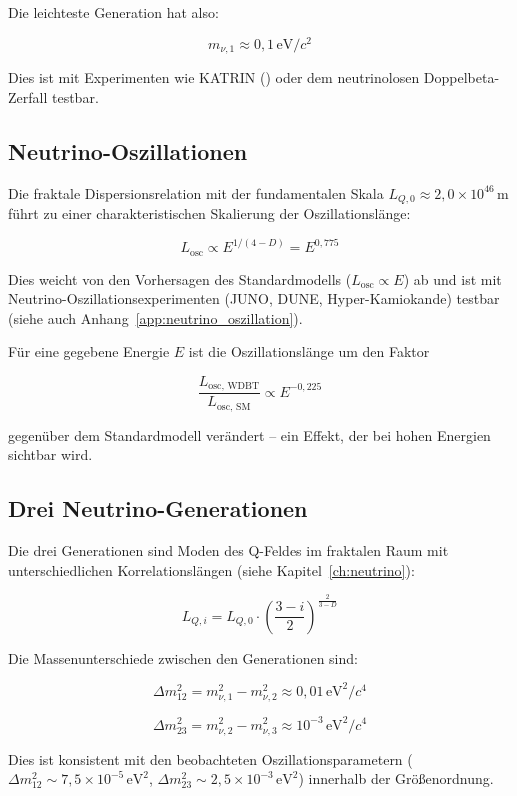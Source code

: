 Die leichteste Generation hat also:

\[
\boxed{m_{\nu,1} \approx 0,1 \, \text{eV}/c^2}
\]

Dies ist mit Experimenten wie KATRIN (\cite{KATRIN2022}) oder dem neutrinolosen Doppelbeta-Zerfall testbar.

\subsection{Neutrino-Oszillationen}
\label{sub:vorh_neutrino_osz}

Die fraktale Dispersionsrelation mit der fundamentalen Skala \( L_{Q,0} \approx 2{,}0 \times 10^{46} \, \text{m} \) führt zu einer charakteristischen Skalierung der Oszillationslänge:

\[
L_{\text{osc}} \propto E^{1/(4-D)} = E^{0,775}
\]

Dies weicht von den Vorhersagen des Standardmodells (\( L_{\text{osc}} \propto E \)) ab und ist mit Neutrino-Oszillationsexperimenten (JUNO, DUNE, Hyper-Kamiokande) testbar (siehe auch Anhang~\ref{app:neutrino_oszillation}).

Für eine gegebene Energie \( E \) ist die Oszillationslänge um den Faktor

\[
\frac{L_{\text{osc, WDBT}}}{L_{\text{osc, SM}}} \propto E^{-0,225}
\]

gegenüber dem Standardmodell verändert – ein Effekt, der bei hohen Energien sichtbar wird.

\subsection{Drei Neutrino-Generationen}
\label{sub:vorh_drei_generationen}

Die drei Generationen sind Moden des Q-Feldes im fraktalen Raum mit unterschiedlichen Korrelationslängen (siehe Kapitel~\ref{ch:neutrino}):

\[
L_{Q,i} = L_{Q,0} \cdot \left(\frac{3-i}{2}\right)^{\frac{2}{3-D}}
\]

Die Massenunterschiede zwischen den Generationen sind:

\[
\Delta m_{12}^2 = m_{\nu,1}^2 - m_{\nu,2}^2 \approx 0,01 \, \text{eV}^2/c^4
\]

\[
\Delta m_{23}^2 = m_{\nu,2}^2 - m_{\nu,3}^2 \approx 10^{-3} \, \text{eV}^2/c^4
\]

Dies ist konsistent mit den beobachteten Oszillationsparametern (\( \Delta m_{12}^2 \sim 7,5 \times 10^{-5} \, \text{eV}^2 \), \( \Delta m_{23}^2 \sim 2,5 \times 10^{-3} \, \text{eV}^2 \)) innerhalb der Größenordnung.

